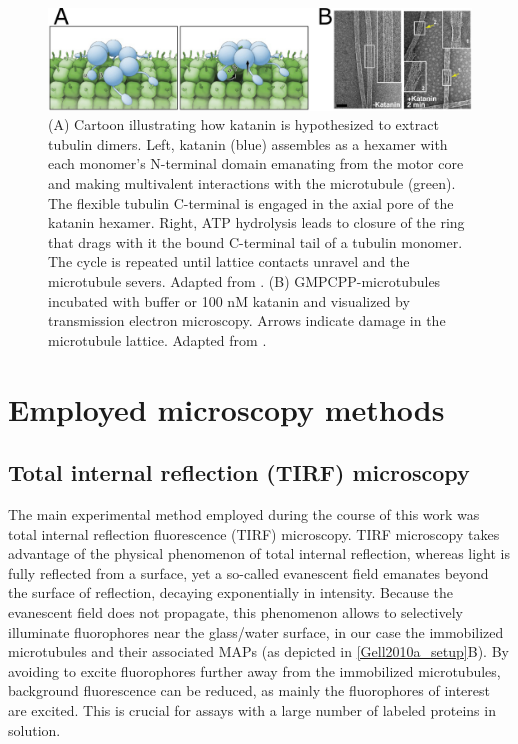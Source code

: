\begin{figure}[h!tb]
\centering
\includegraphics[scale=1.1]{Figures/katanin.png}
\caption[Introduction to katanin.]{
(A) Cartoon illustrating how katanin is hypothesized to extract tubulin dimers. Left, katanin (blue) assembles as a hexamer with each monomer's N-terminal domain emanating from the motor core and making multivalent interactions with the microtubule (green). The flexible tubulin C-terminal is engaged in the axial pore of the katanin hexamer. Right, ATP hydrolysis leads to closure of the ring that drags with it the bound C-terminal tail of a tubulin monomer. The cycle is repeated until lattice contacts unravel and the microtubule severs. Adapted from \cite{Zehr2017}. (B) GMPCPP-microtubules incubated with buffer or 100 nM katanin and visualized by transmission electron microscopy. Arrows indicate damage in the microtubule lattice. Adapted from \cite{Grigorieff2018}.
	}\label{katanin}
\end{figure}

\section{Employed microscopy methods}
\label{sec:microscopy}
\subsection{Total internal reflection (TIRF) microscopy}
The main experimental method employed during the course of this work was total internal reflection fluorescence (TIRF) microscopy. TIRF microscopy takes advantage of the physical phenomenon of total internal reflection, whereas light is fully reflected from a surface, yet a so-called evanescent field emanates beyond the surface of reflection, decaying exponentially in intensity. Because the evanescent field does not propagate, this phenomenon allows to selectively illuminate fluorophores near the glass/water surface, in our case the immobilized microtubules and their associated MAPs (as depicted in \ref{Gell2010a_setup}B). By avoiding to excite fluorophores further away from the immobilized microtubules, background fluorescence can be reduced, as mainly the fluorophores of interest are excited. This is crucial for assays with a large number of labeled proteins in solution. 

